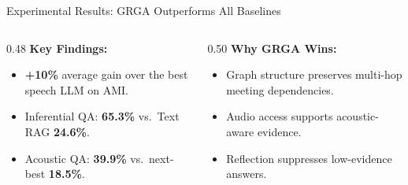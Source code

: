 \documentclass[aspectratio=169,10pt]{beamer}
\newcommand{\highlight}[1]{\textcolor{ACLOrange}{\textbf{#1}}}
\newcommand{\tightitems}{\setlength\itemsep{0.12em}\setlength\parsep{0pt}\setlength\topsep{0.1em}}
\begin{document}
\begin{frame}[t]{Experimental Results: GRGA Outperforms All Baselines}
  \vspace{0.18cm}
  \begin{columns}[T]
    \begin{column}{0.48\textwidth}
      \footnotesize
      \textcolor{ACLBlue}{\textbf{Key Findings:}}
      \begin{itemize}\tightitems
        \item \highlight{+10\%} average gain over the best speech LLM on AMI.
        \item Inferential QA: \textbf{65.3\%} vs.\ Text RAG \textbf{24.6\%}.
        \item Acoustic QA: \textbf{39.9\%} vs.\ next-best \textbf{18.5\%}.
      \end{itemize}
    \end{column}
    \begin{column}{0.50\textwidth}
      \footnotesize
      \textcolor{ACLBlue}{\textbf{Why GRGA Wins:}}
      \begin{itemize}\tightitems
        \item Graph structure preserves multi-hop meeting dependencies.
        \item Audio access supports acoustic-aware evidence.
        \item Reflection suppresses low-evidence answers.
      \end{itemize}
    \end{column}
  \end{columns}
\end{frame}
\end{document}
